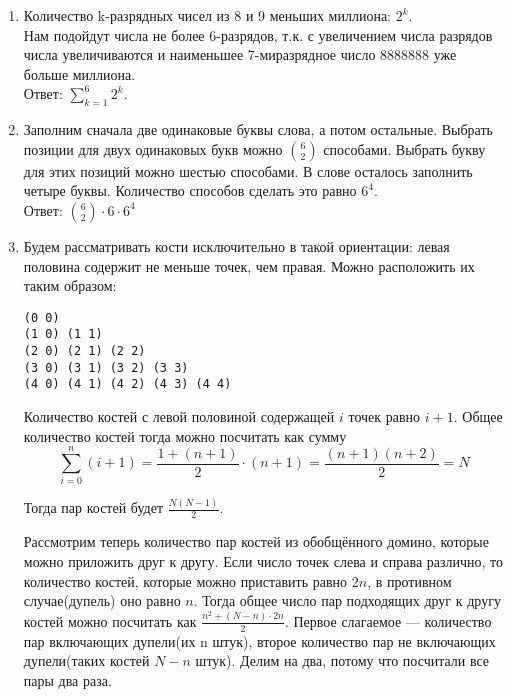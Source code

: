 \documentclass{article}
\begin{document}
\begin{enumerate}
\item Количество k-разрядных чисел из 8 и 9 меньших миллиона: $2^k$.\\
Нам подойдут числа не более 6-разрядов, т.к. с увеличением числа разрядов числа
увеличиваются и наименьшее 7-миразрядное число 8888888 уже больше миллиона.\\
Ответ: $\sum_{k = 1}^{6}{2^k}$.

\item Заполним сначала две одинаковые буквы слова, а потом остальные. Выбрать
позиции для двух одинаковых букв можно ${6 \choose 2}$ способами. Выбрать
букву для этих позиций можно шестью способами. В слове осталось заполнить четыре
буквы. Количество способов сделать это равно $6^4$.\\
Ответ: ${6 \choose 2} \cdot 6 \cdot 6^4$

\item 
Будем рассматривать кости исключительно в такой ориентации: левая половина
содержит не меньше точек, чем правая. Можно расположить их таким образом:

\begin{verbatim}
(0 0)
(1 0) (1 1)
(2 0) (2 1) (2 2)
(3 0) (3 1) (3 2) (3 3)
(4 0) (4 1) (4 2) (4 3) (4 4)
\end{verbatim}

Количество костей с левой половиной содержащей $i$ точек равно $i + 1$. Общее
количество костей тогда можно посчитать как сумму
$$\sum_{i = 0}^{n}{(i + 1)} 
= \frac{1 + (n + 1)}{2} \cdot (n + 1) 
= \frac{(n + 1)(n + 2)}{2} = N$$

Тогда пар костей будет $\frac{N (N - 1)}{2}$.

Рассмотрим теперь количество пар костей из обобщённого домино, которые можно
приложить друг к другу. Если число точек слева и справа различно, то количество
костей, которые можно приставить равно $2n$, в противном случае(дупель) оно
равно $n$. Тогда общее число пар подходящих друг к другу костей можно посчитать
как $\frac{n^2+(N-n)\cdot 2n}{2}$. Первое слагаемое --- количество пар
включающих дупели(их n штук), второе количество пар не включающих дупели(таких
костей $N-n$ штук). Делим на два, потому что посчитали все пары два раза.

\end{enumerate}
\end{document}
